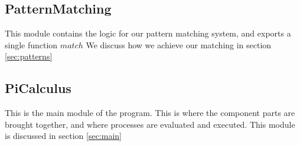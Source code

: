 \subsection{PatternMatching}

This module contains the logic for our pattern matching system, and exports a single function $match$
We discuss how we achieve our matching in section \ref{sec:patterns}

\subsection{PiCalculus}

This is the main module of the program. This is where the component parts are brought together, and where processes are evaluated and executed. This module is discussed in section \ref{sec:main}

